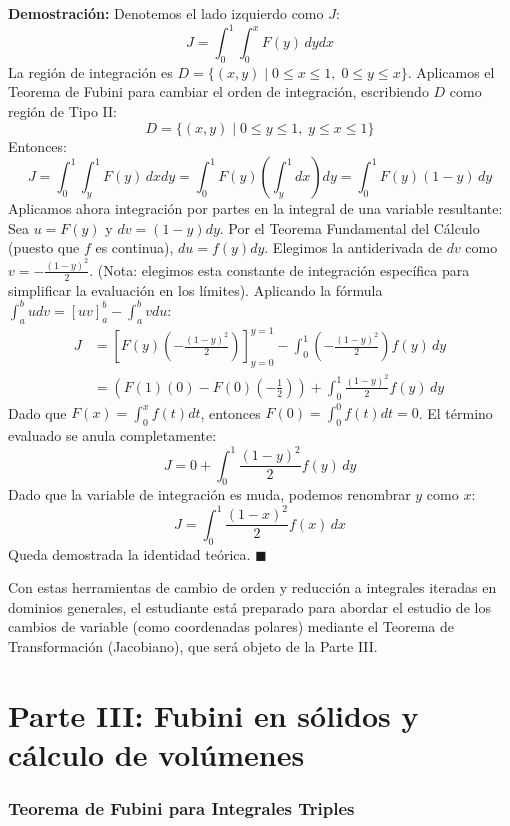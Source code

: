 \documentclass[11pt,a4paper]{article}
\begin{document}
\textbf{Demostración:}
Denotemos el lado izquierdo como $J$:
\[
J = \int_0^1 \int_0^x F(y) \, dy dx
\]
La región de integración es $D = \{ (x,y) \mid 0 \leq x \leq 1, \; 0 \leq y \leq x \}$.
Aplicamos el Teorema de Fubini para cambiar el orden de integración, escribiendo $D$ como región de Tipo II:
\[
D = \{ (x,y) \mid 0 \leq y \leq 1, \; y \leq x \leq 1 \}
\]
Entonces:
\[
J = \int_0^1 \int_y^1 F(y) \, dx dy = \int_0^1 F(y) \left( \int_y^1 dx \right) dy = \int_0^1 F(y)(1 - y) \, dy
\]
Aplicamos ahora integración por partes en la integral de una variable resultante:
Sea $u = F(y)$ y $dv = (1-y) dy$.
Por el Teorema Fundamental del Cálculo (puesto que $f$ es continua), $du = f(y) dy$.
Elegimos la antiderivada de $dv$ como $v = -\frac{(1-y)^2}{2}$. (Nota: elegimos esta constante de integración específica para simplificar la evaluación en los límites).
Aplicando la fórmula $\int_a^b u dv = \left[uv\right]_a^b - \int_a^b v du$:
\begin{align*}
J &= \left[ F(y) \left( -\frac{(1-y)^2}{2} \right) \right]_{y=0}^{y=1} - \int_0^1 \left( -\frac{(1-y)^2}{2} \right) f(y) \, dy \\
  &= \left( F(1)(0) - F(0)\left(-\frac{1}{2}\right) \right) + \int_0^1 \frac{(1-y)^2}{2} f(y) \, dy
\end{align*}
Dado que $F(x) = \int_0^x f(t)dt$, entonces $F(0) = \int_0^0 f(t)dt = 0$. El término evaluado se anula completamente:
\[
J = 0 + \int_0^1 \frac{(1-y)^2}{2} f(y) \, dy
\]
Dado que la variable de integración es muda, podemos renombrar $y$ como $x$:
\[
J = \int_0^1 \frac{(1-x)^2}{2} f(x) \, dx
\]
Queda demostrada la identidad teórica. $\blacksquare$

\vspace{0.5cm}
Con estas herramientas de cambio de orden y reducción a integrales iteradas en dominios generales, el estudiante está preparado para abordar el estudio de los cambios de variable (como coordenadas polares) mediante el Teorema de Transformación (Jacobiano), que será objeto de la Parte III.
\part*{Parte III: Fubini en sólidos y cálculo de volúmenes}

\section{Teorema de Fubini para Integrales Triples}
\end{document}
